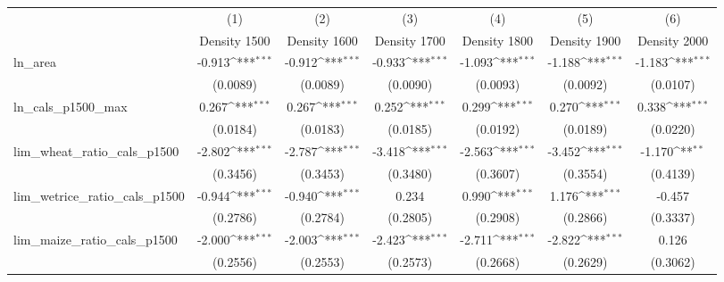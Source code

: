 {
\def\sym#1{\ifmmode^{#1}\else\(^{#1}\)\fi}
\begin{tabular}{l*{6}{c}}
\toprule
                    &\multicolumn{1}{c}{(1)}&\multicolumn{1}{c}{(2)}&\multicolumn{1}{c}{(3)}&\multicolumn{1}{c}{(4)}&\multicolumn{1}{c}{(5)}&\multicolumn{1}{c}{(6)}\\
                    &\multicolumn{1}{c}{Density 1500}&\multicolumn{1}{c}{Density 1600}&\multicolumn{1}{c}{Density 1700}&\multicolumn{1}{c}{Density 1800}&\multicolumn{1}{c}{Density 1900}&\multicolumn{1}{c}{Density 2000}\\
\midrule
ln\_area             &      -0.913\sym{***}&      -0.912\sym{***}&      -0.933\sym{***}&      -1.093\sym{***}&      -1.188\sym{***}&      -1.183\sym{***}\\
                    &    (0.0089)         &    (0.0089)         &    (0.0090)         &    (0.0093)         &    (0.0092)         &    (0.0107)         \\
\addlinespace
ln\_cals\_p1500\_max   &       0.267\sym{***}&       0.267\sym{***}&       0.252\sym{***}&       0.299\sym{***}&       0.270\sym{***}&       0.338\sym{***}\\
                    &    (0.0184)         &    (0.0183)         &    (0.0185)         &    (0.0192)         &    (0.0189)         &    (0.0220)         \\
\addlinespace
lim\_wheat\_ratio\_cals\_p1500&      -2.802\sym{***}&      -2.787\sym{***}&      -3.418\sym{***}&      -2.563\sym{***}&      -3.452\sym{***}&      -1.170\sym{**} \\
                    &    (0.3456)         &    (0.3453)         &    (0.3480)         &    (0.3607)         &    (0.3554)         &    (0.4139)         \\
\addlinespace
lim\_wetrice\_ratio\_cals\_p1500&      -0.944\sym{***}&      -0.940\sym{***}&       0.234         &       0.990\sym{***}&       1.176\sym{***}&      -0.457         \\
                    &    (0.2786)         &    (0.2784)         &    (0.2805)         &    (0.2908)         &    (0.2866)         &    (0.3337)         \\
\addlinespace
lim\_maize\_ratio\_cals\_p1500&      -2.000\sym{***}&      -2.003\sym{***}&      -2.423\sym{***}&      -2.711\sym{***}&      -2.822\sym{***}&       0.126         \\
                    &    (0.2556)         &    (0.2553)         &    (0.2573)         &    (0.2668)         &    (0.2629)         &    (0.3062)         \\

\end{tabular}}

